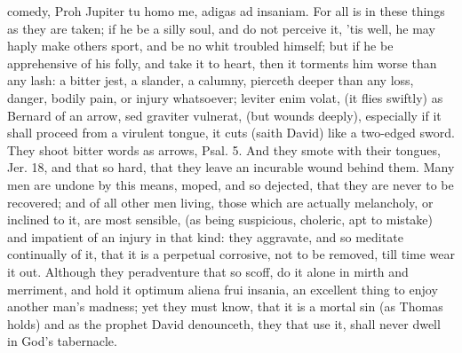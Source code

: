 {{comedy, Proh Jupiter tu homo me, adigas ad insaniam. For all is in
these things as they are taken; if he be a silly soul, and do not
perceive it, 'tis well, he may haply make others sport, and be no whit
troubled himself; but if he be apprehensive of his folly, and take it
to heart, then it torments him worse than any lash: a bitter jest, a
slander, a calumny, pierceth deeper than any loss, danger, bodily pain,
or injury whatsoever; leviter enim volat, (it flies swiftly) as Bernard
of an arrow, sed graviter vulnerat, (but wounds deeply), especially if
it shall proceed from a virulent tongue, it cuts (saith David) like a
two-edged sword. They shoot bitter words as arrows, Psal.  5. And
they smote with their tongues, Jer.  18, and that so hard, that
they leave an incurable wound behind them. Many men are undone by this
means, moped, and so dejected, that they are never to be recovered; and
of all other men living, those which are actually melancholy, or
inclined to it, are most sensible, (as being suspicious, choleric, apt
to mistake) and impatient of an injury in that kind: they aggravate,
and so meditate continually of it, that it is a perpetual corrosive,
not to be removed, till time wear it out. Although they peradventure
that so scoff, do it alone in mirth and merriment, and hold it optimum
aliena frui insania, an excellent thing to enjoy another man's madness;
yet they must know, that it is a mortal sin (as Thomas holds) and
as the prophet David denounceth, they that use it, shall never
dwell in God's tabernacle.

}}
